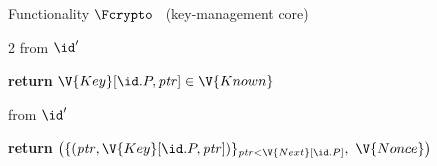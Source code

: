 \begin{interface}[nofloat]{Functionality $\Fcrypto$ \ (key-management core) \\
}
{\begin{multicols}{2}
 \quad from $\id'$
\begin{algorithmic}[1]
\algcont
{}
\State \textbf{return} $\V{Key}[\id.P, \mathit{ptr}] \in \V{Known}$ \label{ln:crycorrupted}
\algsave
\end{algorithmic}
\vspace{1.4ex}

 \quad from $\id'$
\begin{algorithmic}[1]
\algcont
\State \textbf{return} $\bigl(\{(\mathit{ptr}, \V{Key}[\id.P, \mathit{ptr}])\}_{\mathit{ptr} < \V{Next}[\id.P]},\ \V{Nonce}\bigr)$ \label{ln:cryleak}
\algsave
\end{algorithmic}
\end{multicols}}
\end{interface}
